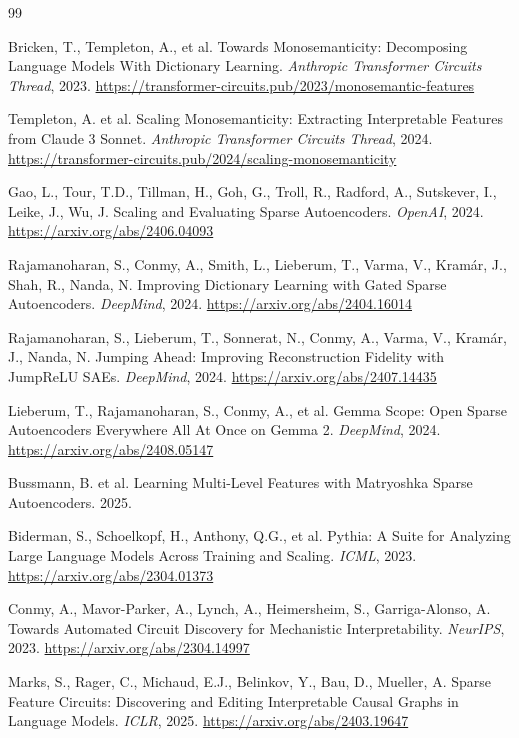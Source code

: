 \documentclass[11pt]{article}
\begin{document}
\begin{thebibliography}{99}

Bricken, T., Templeton, A., et al. Towards Monosemanticity: Decomposing
Language Models With Dictionary Learning. \emph{Anthropic Transformer
Circuits Thread}, 2023.
\url{https://transformer-circuits.pub/2023/monosemantic-features}

Templeton, A. et al. Scaling Monosemanticity: Extracting Interpretable
Features from Claude 3 Sonnet. \emph{Anthropic Transformer Circuits
Thread}, 2024.
\url{https://transformer-circuits.pub/2024/scaling-monosemanticity}

Gao, L., Tour, T.D., Tillman, H., Goh, G., Troll, R., Radford, A.,
Sutskever, I., Leike, J., Wu, J. Scaling and Evaluating Sparse
Autoencoders. \emph{OpenAI}, 2024.
\url{https://arxiv.org/abs/2406.04093}

Rajamanoharan, S., Conmy, A., Smith, L., Lieberum, T., Varma, V.,
Kram\'ar, J., Shah, R., Nanda, N. Improving Dictionary Learning with
Gated Sparse Autoencoders. \emph{DeepMind}, 2024.
\url{https://arxiv.org/abs/2404.16014}

Rajamanoharan, S., Lieberum, T., Sonnerat, N., Conmy, A., Varma, V.,
Kram\'ar, J., Nanda, N. Jumping Ahead: Improving Reconstruction Fidelity
with JumpReLU SAEs. \emph{DeepMind}, 2024.
\url{https://arxiv.org/abs/2407.14435}

Lieberum, T., Rajamanoharan, S., Conmy, A., et al. Gemma Scope: Open
Sparse Autoencoders Everywhere All At Once on Gemma 2. \emph{DeepMind},
2024.
\url{https://arxiv.org/abs/2408.05147}

Bussmann, B. et al. Learning Multi-Level Features with Matryoshka Sparse
Autoencoders. 2025.

Biderman, S., Schoelkopf, H., Anthony, Q.G., et al. Pythia: A Suite for
Analyzing Large Language Models Across Training and Scaling. \emph{ICML},
2023. \url{https://arxiv.org/abs/2304.01373}

Conmy, A., Mavor-Parker, A., Lynch, A., Heimersheim, S., Garriga-Alonso,
A. Towards Automated Circuit Discovery for Mechanistic Interpretability.
\emph{NeurIPS}, 2023. \url{https://arxiv.org/abs/2304.14997}

Marks, S., Rager, C., Michaud, E.J., Belinkov, Y., Bau, D., Mueller, A.
Sparse Feature Circuits: Discovering and Editing Interpretable Causal
Graphs in Language Models. \emph{ICLR}, 2025.
\url{https://arxiv.org/abs/2403.19647}

\end{thebibliography}
\end{document}
